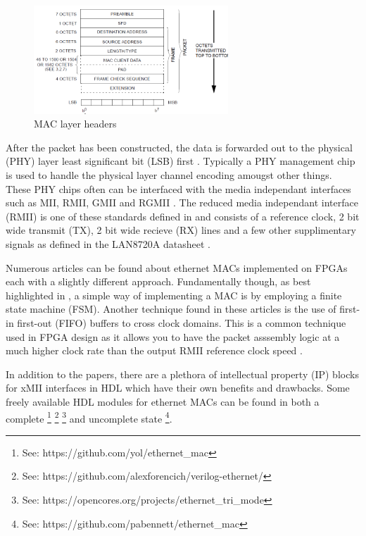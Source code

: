 \begin{figure}[h]
    \centering
    \includegraphics[width=0.65\textwidth]{Images/mac_packet.png}
    \caption{MAC layer headers \cite{IEEE802.3-2012}}
    \label{fig:ieee-mac-headers}
\end{figure}

After the packet has been constructed, the data is forwarded out to the physical (PHY) layer 
least significant bit (LSB) first \cite{IEEE802.3-2012}. Typically a PHY management chip is used to handle the physical layer channel encoding amougst other things. 
These PHY chips often can be interfaced with the media independant interfaces such as MII, RMII, GMII and RGMII \cite{OptimisedEthernetMAC}. The reduced media 
independant interface (RMII) is one of these standards defined in \cite{IEEE802.3-2012} and consists of a reference clock, 2 bit wide transmit (TX), 2 bit wide 
recieve (RX) lines and a few other supplimentary signals as defined in the LAN8720A datasheet \cite{LAN8720ADatasheet}.

Numerous articles \cite{OptimisedEthernetMAC} \cite{EthernetAXI} \cite{EthernetRMII} can be found about ethernet MACs implemented on FPGAs each with a slightly 
different approach. Fundamentally though, as best highlighted in \cite{OptimisedEthernetMAC}, a simple way of implementing a MAC is by employing a finite state 
machine (FSM). Another technique found in these articles is the use of first-in first-out (FIFO) buffers to cross clock domains. This is a common technique used 
in FPGA design as it allows you to have the packet asssembly logic at a much higher clock rate than the output RMII reference clock speed \cite{EthernetAXI}. 

\newpage

In addition to the papers, there are a plethora of intellectual property (IP) blocks for xMII interfaces in HDL 
which have their own benefits and drawbacks. Some freely available HDL modules for ethernet MACs can be found in both a complete \footnote[1]{See: https://github.com/yol/ethernet\_mac} \footnote[2]{See: https://github.com/alexforencich/verilog-ethernet/} 
\footnote[3]{See: https://opencores.org/projects/ethernet\_tri\_mode} and uncomplete state
\footnote[4]{See: https://github.com/pabennett/ethernet\_mac}.





